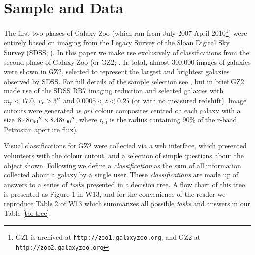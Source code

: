 \documentclass[usenatbib]{mn2e}
\begin{document}


\section{Sample and Data} \label{sample}

The first two phases of Galaxy Zoo (which ran from July 2007-April 2010\footnote{GZ1 is archived at {\tt http://zoo1.galaxyzoo.org}, and GZ2 at {\tt http://zoo2.galaxyzoo.org}}) were entirely based on imaging from the Legacy Survey of the Sloan Digital Sky Survey (SDSS; \citealt{York2000}). In this paper we make use exclusively of classifications from the second phase of Galaxy Zoo (or GZ2; \citealt{Willett2013}. In total, almost 300,000 images of galaxies were shown in GZ2, selected to represent the largest and brightest galaxies observed by SDSS. For full details of the sample selection see \citep{Willett2013}, but in brief GZ2 made use of the SDSS DR7 imaging reduction \citep{DR7} and selected galaxies with $m_r<17.0$, $r_r>3\hbox{$^{\prime\prime}$}$ and $0.0005<z<0.25$ (or with no measured redshift). Image cutouts were generated as $gri$ colour composites centred on each galaxy with a size $8.48r_{90}\hbox{$^{\prime\prime}$} \times 8.48r_{90}\hbox{$^{\prime\prime}$}$, where $r_{90}$ is the radius containing 90\% of the r-band Petrosian aperture flux). 

Visual classifications for GZ2 were collected via a web interface, which presented volunteers with the colour cutout, and a selection of simple questions about the object shown. Following \citet[hereafter W13]{Willett2013} we define a {\it classification} as the sum of all information collected about a galaxy by a single user. These {\it classifications} are made up of answers to a series of {\it tasks} presented in a decision tree. A flow chart of this tree is presented as Figure 1 in W13, and for the convenience of the reader we reproduce Table 2 of W13 which summarizes all possible {\it tasks} and answers in our Table \ref{tbl-tree}. 
\end{document}
